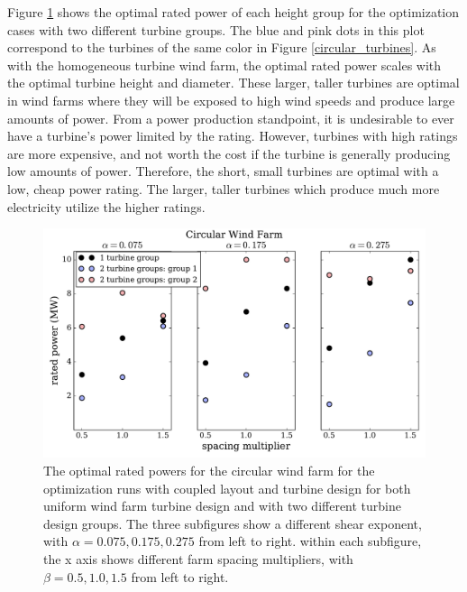 Figure \ref{circular_power} shows the optimal rated power of each height group for the optimization cases with two different turbine groups. The blue and pink dots in this plot correspond to the turbines of the same color in Figure \ref{circular_turbines}. As with the homogeneous turbine wind farm, the optimal rated power scales with the optimal turbine height and diameter. These larger, taller turbines are optimal in wind farms where they will be exposed to high wind speeds and produce large amounts of power. From a power production standpoint, it is undesirable to ever have a turbine's power limited by the rating. However, turbines with high ratings are more expensive, and not worth the cost if the turbine is generally producing low amounts of power. Therefore, the short, small turbines are optimal with a low, cheap power rating. The larger, taller turbines which produce much more electricity utilize the higher ratings. 


\begin{figure}[htbp]
  \centering
  \includegraphics[width=\textwidth]{Figures/circlePowers.pdf}
  \caption{\label{circular_power} The optimal rated powers for the circular wind farm for the optimization runs with coupled layout and turbine design for both uniform wind farm turbine design and with two different turbine design groups. The three subfigures show a different shear exponent, with $\alpha=0.075,0.175,0.275$ from left to right. within each subfigure, the x axis shows different farm spacing multipliers, with $\beta=0.5,1.0,1.5$ from left to right.}
\end{figure}

